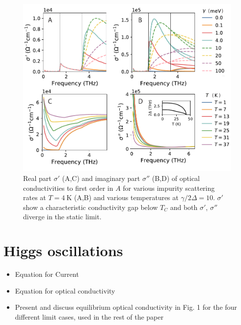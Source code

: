 \documentclass[aps,prb,reprint,noeprint,superscriptaddress]{revtex4-1}
\begin{document}
\begin{figure}[ht]
	\centering
	\includegraphics[width=\columnwidth]{figures/m-fig1.pdf}
	\caption{Real part $\sigma'$ (A,C) and imaginary part $\sigma''$ (B,D)
		of optical conductivities to first order in $A$ 
	for various impurity scattering rates at $T=\SI{4}{\kelvin}$ (A,B) and
various temperatures at $\gamma/2\Delta=10$. $\sigma'$ show a characteristic
conductivity gap below $T_C$ and both $\sigma'$, $\sigma''$ diverge in the
static limit.}
\label{fig:singleband-gap}
\end{figure}

\section{Higgs oscillations}
\label{sec:higgs_oscillations}

\begin{itemize}
	\item Equation for Current
	\item Equation for optical conductivity
	\item Present and discuss equilibrium optical conductivity in Fig. 1 for the four different limit cases, used in the rest of the paper
\end{itemize}
\end{document}

